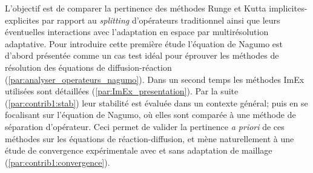 \label{par:contrib_imex}
L'objectif est de comparer la pertinence des méthodes Runge et Kutta implicites-explicites par rapport au \textit{splitting} d'opérateurs traditionnel ainsi
que leurs éventuelles interactions avec l'adaptation en espace par multirésolution adaptative.
Pour introduire cette première étude l'équation de Nagumo est d'abord présentée comme un cas
test idéal pour éprouver les méthodes de résolution des équations de diffusion-réaction (\ref{par:analyser_operateurs_nagumo}).
Dans un second temps les méthodes ImEx utilisées sont détaillées (\ref{par:ImEx_presentation}).
Par la suite (\ref{par:contrib1:stab}) leur stabilité est évaluée dans un contexte général; puis en se focalisant sur l'équation de Nagumo, où elles sont comparée 
à une méthode de séparation d'opérateur.
Ceci permet de valider la pertinence \textit{a priori} de ces méthodes sur les équations de réaction-diffusion, 
et mène naturellement à une étude de convergence expérimentale avec et sans adaptation de maillage (\ref{par:contrib1:convergence}).